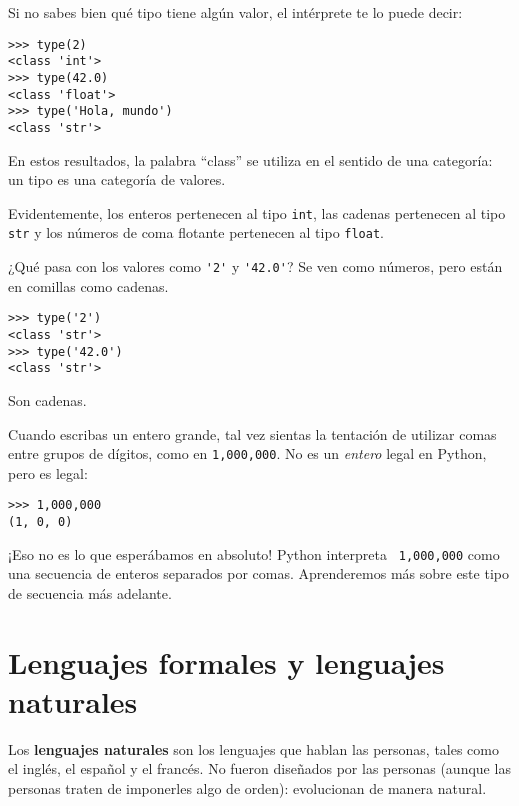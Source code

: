 \documentclass[10pt]{book}
\begin{document}
Si no sabes bien qué tipo tiene algún valor, el intérprete te lo
puede decir:

\begin{verbatim}
>>> type(2)
<class 'int'>
>>> type(42.0)
<class 'float'>
>>> type('Hola, mundo')
<class 'str'>
\end{verbatim}
%
En estos resultados, la palabra ``class'' se utiliza en el sentido de
una categoría: un tipo es una categoría de valores.

Evidentemente, los enteros pertenecen al tipo {\tt int},
las cadenas pertenecen al tipo {\tt str} y los números de
coma flotante pertenecen al tipo {\tt float}.

¿Qué pasa con los valores como \verb"'2'" y \verb"'42.0'"?
Se ven como números, pero están en comillas como
cadenas.

\begin{verbatim}
>>> type('2')
<class 'str'>
>>> type('42.0')
<class 'str'>
\end{verbatim}
%
Son cadenas.

Cuando escribas un entero grande, tal vez sientas la tentación de utilizar comas
entre grupos de dígitos, como en {\tt 1,000,000}.  No es un
{\em entero} legal en Python, pero es legal:

\begin{verbatim}
>>> 1,000,000
(1, 0, 0)
\end{verbatim}
%
¡Eso no es lo que esperábamos en absoluto!  Python interpreta {\tt
  1,000,000} como una secuencia de enteros separados por comas.  Aprenderemos
más sobre este tipo de secuencia más adelante.




\section{Lenguajes formales y lenguajes naturales}

Los {\bf lenguajes naturales} son los lenguajes que hablan las personas,
tales como el inglés, el español y el francés.  No fueron diseñados
por las personas (aunque las personas traten de imponerles algo de orden):
evolucionan de manera natural.
\end{document}
